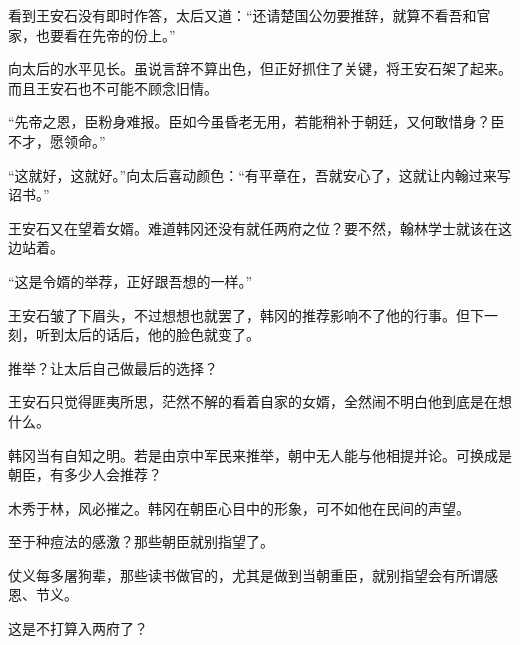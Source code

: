 看到王安石没有即时作答，太后又道：“还请楚国公勿要推辞，就算不看吾和官家，也要看在先帝的份上。”

向太后的水平见长。虽说言辞不算出色，但正好抓住了关键，将王安石架了起来。而且王安石也不可能不顾念旧情。

“先帝之恩，臣粉身难报。臣如今虽昏老无用，若能稍补于朝廷，又何敢惜身？臣不才，愿领命。”

“这就好，这就好。”向太后喜动颜色：“有平章在，吾就安心了，这就让内翰过来写诏书。”

王安石又在望着女婿。难道韩冈还没有就任两府之位？要不然，翰林学士就该在这边站着。

“这是令婿的举荐，正好跟吾想的一样。”

王安石皱了下眉头，不过想想也就罢了，韩冈的推荐影响不了他的行事。但下一刻，听到太后的话后，他的脸色就变了。

推举？让太后自己做最后的选择？

王安石只觉得匪夷所思，茫然不解的看着自家的女婿，全然闹不明白他到底是在想什么。

韩冈当有自知之明。若是由京中军民来推举，朝中无人能与他相提并论。可换成是朝臣，有多少人会推荐？

木秀于林，风必摧之。韩冈在朝臣心目中的形象，可不如他在民间的声望。

至于种痘法的感激？那些朝臣就别指望了。

仗义每多屠狗辈，那些读书做官的，尤其是做到当朝重臣，就别指望会有所谓感恩、节义。

这是不打算入两府了？



